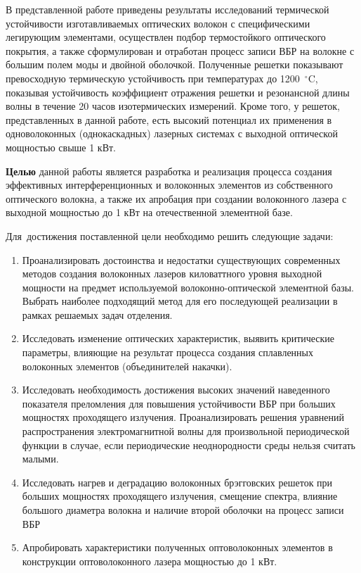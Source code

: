 В представленной работе приведены результаты исследований термической устойчивости изготавливаемых оптических волокон с специфическими легирующим элементами, осуществлен подбор термостойкого оптического покрытия, а также сформулирован и отработан процесс записи ВБР на волокне с большим полем моды и двойной оболочкой. Полученные решетки показывают превосходную термическую устойчивость при температурах до 1200~$^\circ$C, показывая устойчивость коэффициент отражения решетки и резонансной длины волны в течение 20 часов изотермических измерений. Кроме того, у решеток, представленных в данной работе, есть высокий потенциал их применения в одноволоконных (однокаскадных) лазерных системах с выходной оптической мощностью свыше 1 кВт.

\textbf{Целью} данной работы является разработка и реализация процесса создания эффективных интерференционных и волоконных элементов из собственного оптического волокна, а также их апробация при создании волоконного лазера с выходной мощностью до 1 кВт на отечественной элементной базе.

Для~достижения поставленной цели необходимо решить следующие задачи:
\begin{enumerate}
  \item Проанализировать достоинства и недостатки существующих современных методов создания волоконных лазеров киловаттного уровня выходной мощности на предмет используемой волоконно-оптической элементной базы. Выбрать наиболее подходящий метод для его последующей реализации в рамках решаемых задач отделения.
  \item Исследовать изменение оптических характеристик, выявить критические параметры, влияющие на результат процесса создания сплавленных волоконных элементов (объединителей накачки).
  \item Исследовать необходимость достижения высоких значений наведенного показателя преломления для повышения устойчивости ВБР при больших мощностях проходящего излучения. Проанализировать решения уравнений распространения электромагнитной волны для произвольной периодической функции в случае, если периодические неоднородности среды нельзя считать малыми.
  \item Исследовать нагрев и деградацию волоконных брэгговских решеток при больших мощностях проходящего излучения, смещение спектра, влияние большого диаметра волокна и наличие второй оболочки на процесс записи ВБР
  \item Апробировать характеристики полученных оптоволоконных элементов в конструкции оптоволоконного лазера мощностью до 1 кВт.
\end{enumerate}

